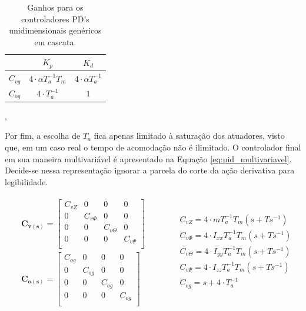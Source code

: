 \documentclass[main.tex]{subfiles}
\begin{document}
	\begin{table}[!h]
		\centering
		\caption{Ganhos para os controladores PD's unidimensionais genéricos em cascata.}
		\begin{tabular}{|c|c|c|}
			\cline{2-3}
			\multicolumn{1}{c|}{} & $K_p$  & $K_d$ \\\hline
			$C_{vg}$ & $4\cdot \alpha T_a^{-1} T_m$ & $4 \cdot\alpha T_a^{-1}$ \\\hline
			$C_{og}$ & $4\cdot T_a^{-1}$ & $1$ \\\hline
		\end{tabular}
		\label{tab:controlador_pd}
	\end{table},
	
	
	Por fim, a escolha de $T_a$ fica apenas limitado à saturação dos atuadores, visto que, em um caso real o tempo de acomodação não é ilimitado. O controlador final em sua maneira multivariável é apresentado na Equação \ref{eq:pid_multivariavel}. Decide-se nessa representação ignorar a parcela do corte da ação derivativa para legibilidade.
	
	\begin{equation}\label{eq:pid_multivariavel}
		\begin{matrix}
			\begin{split}
				&\boldsymbol{C_{v(s)}} = \begin{bmatrix}
					C_{vZ} & 0 & 0 & 0\\
					0 & C_{v\Phi} & 0 & 0\\
					0 & 0 & C_{v\Theta} & 0\\
					0 & 0 & 0 & C_{v\Psi}\\
				\end{bmatrix}\\
				&\boldsymbol{C_{o(s)}} = \begin{bmatrix}
					C_{og} & 0 & 0 & 0\\
					0 & C_{og} & 0 & 0\\
					0 & 0 & C_{og} & 0\\
					0 & 0 & 0 & C_{og}\\
				\end{bmatrix}\hspace{1cm}
			\end{split}&
			\begin{split}
				&C_{vZ} = 4\cdot m T_a^{-1} T_m(s + Ts^{-1})\\
				&C_{v\Phi} = 4\cdot I_{xx} T_a^{-1} T_m(s + Ts^{-1})\\
				&C_{v\Theta} = 4\cdot I_{yy} T_a^{-1} T_m(s + Ts^{-1})\\
				&C_{v\Psi} = 4\cdot I_{zz} T_a^{-1} T_m(s + Ts^{-1})\\
				&C_{og} = s + 4\cdot{T_a^{-1}}\\
			\end{split}
			
		\end{matrix}
	\end{equation}
	
\end{document}

